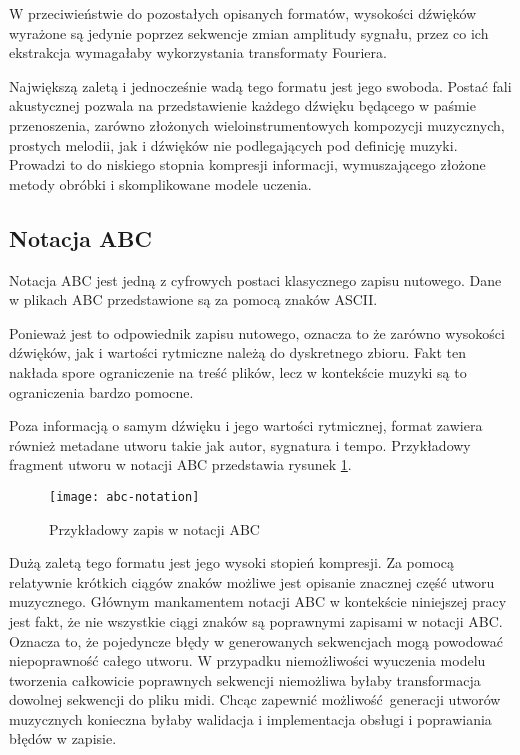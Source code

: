 {{{            W przeciwieństwie do pozostałych opisanych formatów, wysokości dźwięków wyrażone są 
            jedynie poprzez sekwencje zmian amplitudy sygnału, przez co
            ich ekstrakcja wymagałaby wykorzystania transformaty Fouriera.

            Największą zaletą i jednocześnie wadą tego formatu jest jego swoboda. 
            Postać fali akustycznej pozwala na przedstawienie każdego dźwięku będącego w paśmie
            przenoszenia, zarówno złożonych wieloinstrumentowych kompozycji muzycznych, 
            prostych melodii, jak i dźwięków nie podlegających pod definicję muzyki. 
            Prowadzi to do niskiego stopnia kompresji informacji, wymuszającego złożone metody obróbki i skomplikowane
            modele uczenia.
        }

        \subsection{Notacja ABC}\label{chap:abc}
        {
            Notacja ABC jest jedną z cyfrowych postaci klasycznego zapisu nutowego.
            Dane w plikach ABC przedstawione są za pomocą znaków ASCII.

            Ponieważ jest to odpowiednik zapisu nutowego, oznacza to
            że zarówno wysokości dźwięków, jak i wartości rytmiczne należą do dyskretnego zbioru.
            Fakt ten nakłada spore ograniczenie na treść plików, lecz w kontekście muzyki są to 
            ograniczenia bardzo pomocne.

            Poza informacją o samym dźwięku i jego wartości rytmicznej, format zawiera również metadane
            utworu takie jak autor, sygnatura i tempo. Przykładowy fragment utworu w notacji ABC przedstawia
            rysunek \ref{abcnotation}.

            \begin{figure}
                \centering
                \texttt{[image: abc-notation]}
                \caption{Przykładowy zapis w notacji ABC}
                \label{abcnotation}
            \end{figure}

            Dużą zaletą tego formatu jest jego wysoki stopień kompresji. Za pomocą relatywnie krótkich ciągów
            znaków możliwe jest opisanie znacznej część utworu muzycznego. Głównym mankamentem notacji ABC
            w kontekście niniejszej pracy jest fakt, że nie wszystkie ciągi znaków są poprawnymi zapisami 
            w notacji ABC. Oznacza to, że pojedyncze błędy w generowanych sekwencjach mogą powodować niepoprawność całego utworu.
            W przypadku niemożliwości wyuczenia modelu tworzenia całkowicie poprawnych sekwencji niemożliwa byłaby
            transformacja dowolnej sekwencji do pliku midi. Chcąc zapewnić możliwość generacji utworów muzycznych
            konieczna byłaby walidacja i implementacja obsługi i poprawiania błędów w zapisie.
        }

}}
